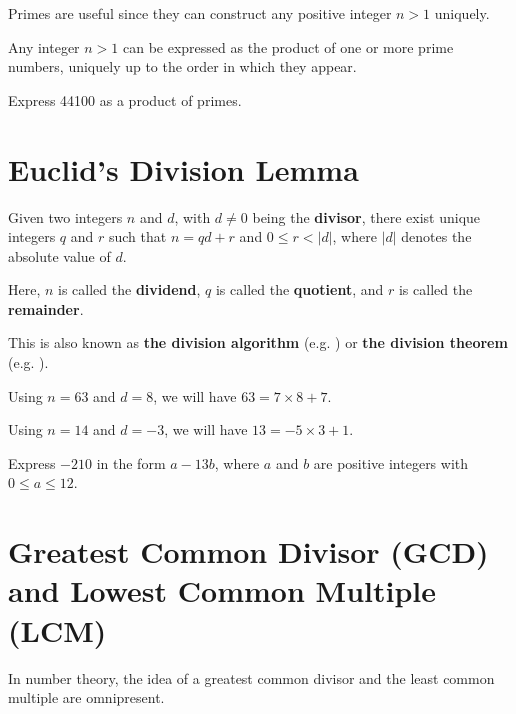 Primes are useful since they can construct any positive integer $n>1$ uniquely.
\begin{theorem}\label{thrm-fundamental-theorem-of-arithmetic}
    Any integer $n > 1$ can be expressed as the product of one or more prime numbers, uniquely up to the order in which they appear.
\end{theorem}

\begin{exercise}
    Express 44100 as a product of primes.
\end{exercise}

\newpage

\section{Euclid's Division Lemma}
\begin{lemma}\label{lemma-euclid-division}
    Given two integers $n$ and $d$, with $d \neq 0$ being the \textbf{divisor}, there exist unique integers $q$ and $r$ such that $n = qd + r$ and $0 \leq r < |d|$, where $|d|$ denotes the absolute value of $d$.

    Here, $n$ is called the \textbf{dividend}, $q$ is called the \textbf{quotient}, and $r$ is called the \textbf{remainder}.
\end{lemma}
\begin{remark}
    This is also known as \textbf{the division algorithm} (e.g. \cite[p.~4]{dummit_foote_2004}) or \textbf{the division theorem} (e.g. \cite[\S 21]{clark_1984}).
\end{remark}

\begin{example}
    Using $n = 63$ and $d = 8$, we will have $63 = 7\times8 + 7$.
\end{example}
\begin{example}
    Using $n = 14$ and $d = -3$, we will have $13 = -5\times3 + 1$.
\end{example}

\begin{exercise}
    Express $-210$ in the form $a-13b$, where $a$ and $b$ are positive integers with $0 \leq a \leq 12$.
\end{exercise}

\section{Greatest Common Divisor (GCD) and Lowest Common Multiple (LCM)}
In number theory, the idea of a greatest common divisor and the least common multiple are omnipresent.


